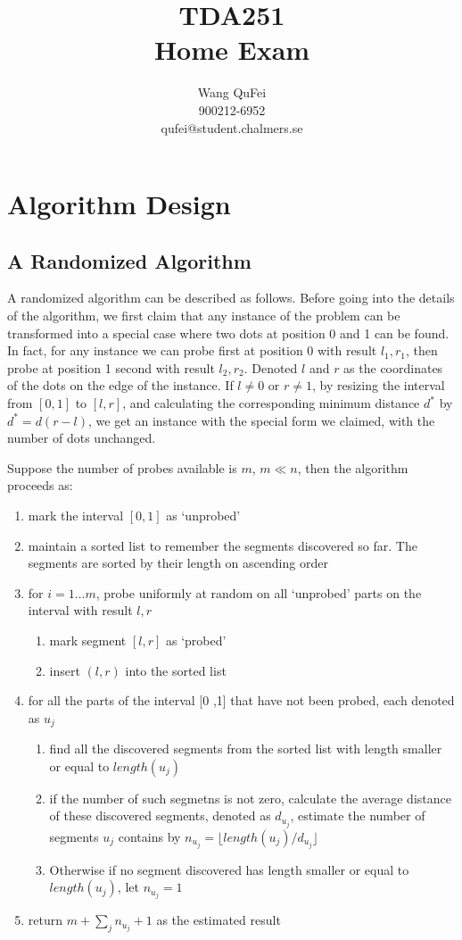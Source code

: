 \documentclass[titlepage]{article}
\title{TDA251\\Home Exam}
\author{Wang QuFei\\900212-6952\\qufei@student.chalmers.se}
\begin{document}
\maketitle
\section{Algorithm Design}
\subsection{A Randomized Algorithm} \label{subsection:random}
A randomized algorithm can be described as follows. Before going into the details of the algorithm, we first claim that any instance of the problem can be transformed into a special case where two dots at position 0 and 1 can be found. In fact, for any instance we can probe first at position 0 with result $l_1,r_1$, then probe at position 1 second with result $l_2, r_2$. Denoted $l$ and $r$ as the coordinates of the dots on the edge of the instance. If $l \neq 0$ or $r \neq 1$, by resizing the interval from $[0, 1]$ to $[l, r]$, and calculating the corresponding minimum distance $d^*$ by $d^* = d (r - l)$, we get an instance with the special form we claimed, with the number of dots unchanged.

Suppose the number of probes available is $m$, $m \ll n$, then the algorithm proceeds as:
\begin{enumerate}
	\item mark the interval $[0, 1]$ as `unprobed'
	\item maintain a sorted list to remember the segments discovered so far. The segments are sorted by their length on ascending order
	\item for $i = 1 \dots m$, probe uniformly at random on all `unprobed' parts on the interval with result $l, r$
		\begin{enumerate}
			\item mark segment $[l, r]$ as `probed'
			\item insert $(l, r)$ into the sorted list
		\end{enumerate}
	\item for all the parts of the interval [0 ,1] that have not been probed, each denoted as $u_j$
		\begin{enumerate}	
			\item find all the discovered segments from the sorted list with length smaller or equal to $length(u_j)$
			\item if the number of such segmetns is not zero, calculate the average distance of these discovered segments, denoted as $d_{u_j}$, estimate the number of segments $u_j$ contains by $n_{u_j} = \lfloor length(u_j) / d_{u_j} \rfloor$
			\item Otherwise if no segment discovered has length smaller or equal to $length(u_j)$, let $n_{u_j} = 1$
		\end{enumerate}
	\item return $m + \sum_{j}n_{u_j} + 1$ as the estimated result
\end{enumerate}
\end{document}
